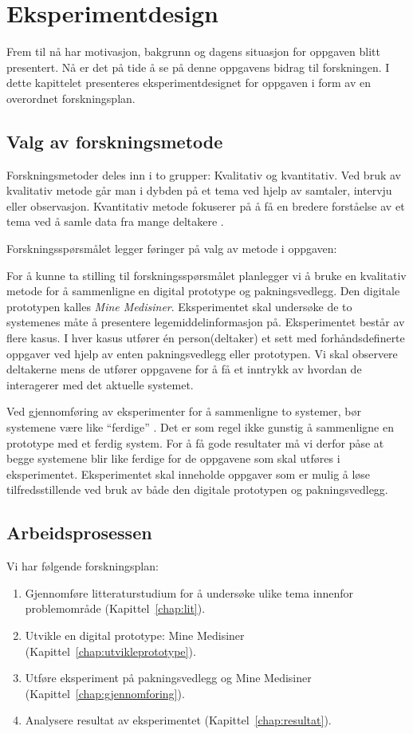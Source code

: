 \chapter{Eksperimentdesign} \label{chap:eksperimentdesign}
Frem til nå har motivasjon, bakgrunn og dagens situasjon for oppgaven blitt presentert. Nå er det på tide å se på denne oppgavens bidrag til forskningen. I dette kapittelet presenteres eksperimentdesignet for oppgaven i form av en overordnet forskningsplan.

\section{Valg av forskningsmetode}
Forskningsmetoder deles inn i to grupper: Kvalitativ og kvantitativ. Ved bruk av kvalitativ metode går man i dybden på et tema ved hjelp av samtaler, intervju eller observasjon. Kvantitativ metode fokuserer på å få en bredere forståelse av et tema ved å samle data fra mange deltakere \citep{Halvorsen1993}.

Forskningsspørsmålet legger føringer på valg av metode i oppgaven:
\thesisRQ

For å kunne ta stilling til forskningsspørsmålet planlegger vi å bruke en kvalitativ metode for å sammenligne en digital prototype og pakningsvedlegg. Den digitale prototypen kalles \textit{Mine Medisiner}. Eksperimentet skal undersøke de to systemenes måte å presentere legemiddelinformasjon på. Eksperimentet består av flere kasus. I hver kasus utfører én person(deltaker) et sett med forhåndsdefinerte oppgaver ved hjelp av enten pakningsvedlegg eller prototypen. Vi skal observere deltakerne mens de utfører oppgavene for å få et inntrykk av hvordan de interagerer med det aktuelle systemet. 

Ved gjennomføring av eksperimenter for å sammenligne to systemer, bør systemene være like ``ferdige'' \citep{toftoy2011praktisk}. Det er som regel ikke gunstig å sammenligne en prototype med et ferdig system. For å få gode resultater må vi derfor påse at begge systemene blir like ferdige for de oppgavene som skal utføres i eksperimentet. Eksperimentet skal inneholde oppgaver som er mulig å løse tilfredsstillende ved bruk av både den digitale prototypen og pakningsvedlegg.

\section{Arbeidsprosessen}
Vi har følgende forskningsplan:
\begin{enumerate}
\item Gjennomføre litteraturstudium for å undersøke ulike tema innenfor problemområde (Kapittel~\ref{chap:lit}).
\item Utvikle en digital prototype: Mine Medisiner (Kapittel~\ref{chap:utvikleprototype}).
\item Utføre eksperiment på pakningsvedlegg og Mine Medisiner (Kapittel~\ref{chap:gjennomforing}).
\item Analysere resultat av eksperimentet (Kapittel~\ref{chap:resultat}).
\end{enumerate}

